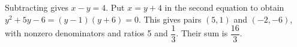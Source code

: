 Subtracting gives $x-y=4$. Put $x=y+4$ in the second equation to obtain $y^2+5y-6=(y-1)(y+6)=0$. This gives pairs $(5,1)$ and $(-2,-6)$, with nonzero denominators and ratios 5 and $\dfrac{1}{3}$. Their sum is $\boxed{\dfrac{16}{3}}$.
